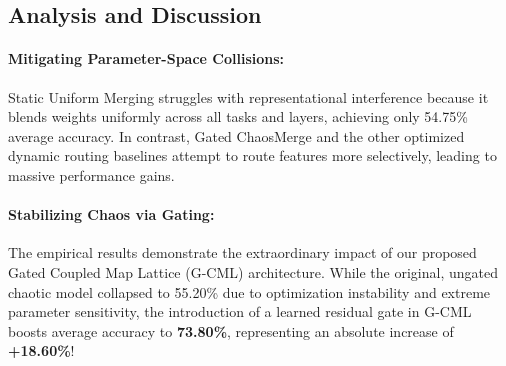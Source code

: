 \subsection{Analysis and Discussion}
\label{subsec:discussion}

\paragraph{Mitigating Parameter-Space Collisions:} 
Static Uniform Merging struggles with representational interference because it blends weights uniformly across all tasks and layers, achieving only 54.75\% average accuracy. In contrast, Gated ChaosMerge and the other optimized dynamic routing baselines attempt to route features more selectively, leading to massive performance gains.

\paragraph{Stabilizing Chaos via Gating:}
The empirical results demonstrate the extraordinary impact of our proposed Gated Coupled Map Lattice (G-CML) architecture. 
While the original, ungated chaotic model collapsed to 55.20\% due to optimization instability and extreme parameter sensitivity, the introduction of a learned residual gate in G-CML boosts average accuracy to \textbf{73.80\%}, representing an absolute increase of \textbf{+18.60\%}!
